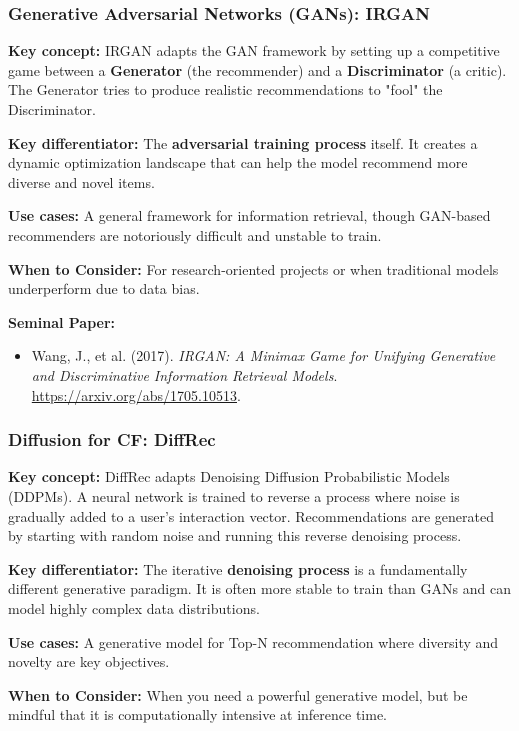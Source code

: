 \documentclass{article}
\begin{document}
    \subsubsection{Generative Adversarial Networks (GANs): IRGAN}
\noindent\textbf{Key concept:} IRGAN adapts the GAN framework by setting up a competitive game between a \textbf{Generator} (the recommender) and a \textbf{Discriminator} (a critic). The Generator tries to produce realistic recommendations to "fool" the Discriminator.

\noindent\textbf{Key differentiator:} The \textbf{adversarial training process} itself. It creates a dynamic optimization landscape that can help the model recommend more diverse and novel items.

\noindent\textbf{Use cases:} A general framework for information retrieval, though GAN-based recommenders are notoriously difficult and unstable to train.

\noindent\textbf{When to Consider:} For research-oriented projects or when traditional models underperform due to data bias.

\noindent\textbf{Seminal Paper:}
    \begin{itemize}
        \item Wang, J., et al. (2017). \textit{IRGAN: A Minimax Game for Unifying Generative and Discriminative Information Retrieval Models}. \url{https://arxiv.org/abs/1705.10513}.
    \end{itemize}

    \subsubsection{Diffusion for CF: DiffRec}
\noindent\textbf{Key concept:} DiffRec adapts Denoising Diffusion Probabilistic Models (DDPMs). A neural network is trained to reverse a process where noise is gradually added to a user's interaction vector. Recommendations are generated by starting with random noise and running this reverse denoising process.

\noindent\textbf{Key differentiator:} The iterative \textbf{denoising process} is a fundamentally different generative paradigm. It is often more stable to train than GANs and can model highly complex data distributions.

\noindent\textbf{Use cases:} A generative model for Top-N recommendation where diversity and novelty are key objectives.

\noindent\textbf{When to Consider:} When you need a powerful generative model, but be mindful that it is computationally intensive at inference time.
\end{document}
